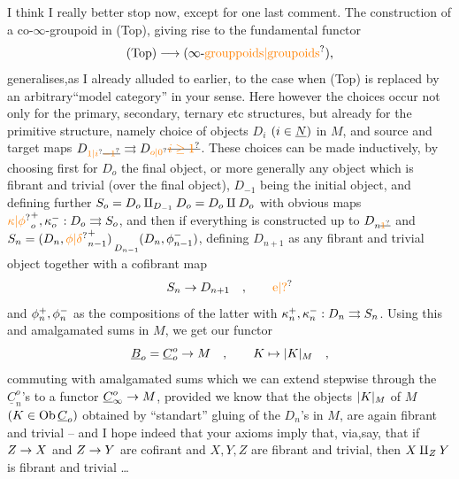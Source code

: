  I think I really better stop now, except for one last comment. The construction of a co-$\infty$-groupoid in (Top), giving rise to the fundamental functor
\[
(\mathrm{Top})\handwritten{\longrightarrow}(\infty\text{-}\unsure{\text{grouppoids}|\text{groupoids}}),
\]
generalises,as I already alluded to earlier, to the case when (Top) is replaced by an arbitrary``model category'' in your sense. Here however the choices occur not only  for the primary, secondary, ternary etc structures, but already for the primitive structure, namely  choice of objects $D_i$ $(i\in\underline{N})$ in $M$, and source and target maps $D_{\unsure{1|i}\deleted{\unsure{-1}}}\handwritten{\rightrightarrows}D_{\unsure{o|0}}\deleted{\unsure{i\geq1}}$. These choices can be made inductively, by choosing first for $D_o$ the final object, or more generally any object which is fibrant and trivial (over the final object), $D_{-1}$ being the initial object, and defining further $S_o=D_o\amalg_{D_{-1}}D_o=D_o\amalg D_o$ with obvious maps ${\handwritten{\unsure{\kappa|\phi}}}_o^{+},\handwritten{\kappa}_o^{-}:D_o\handwritten{\rightrightarrows}S_o$, and then if everything is constructed up to $D_{n\deleted{\unsure{1}}}$\deleted{\unsure{)}} and $S_n=(D_n,{\handwritten{\unsure{\phi|\delta}}}_{n-1}^{+})\mathop{\phantom{\amalg}}\limits_{D_{n-1}}(D_n,\handwritten{\phi}_{n-1}^{-})$, defining $D_{n+1}$ as any fibrant and trivial object together with a cofibrant map
\[
S_n\handwritten{\to}D_{n+1}\quad ,\qquad \unsure{\mathrm{e}|?}
\]
and $\phi_n^+,\phi_n^-$ as the compositions of the latter with $\kappa_n^+,\kappa_n^-:D_n\rightrightarrows S_n$. Using this and amalgamated sums in $M$, we get our functor
\[
\underline{B}_o = \underline{C}_o^{o}\to M\quad ,\qquad K\mapsto|K|_M\quad ,
\]
commuting with amalgamated sums which we can extend stepwise through the $\underline{C}_n^{o}$'s to a functor $\underline{C}_{\infty}^{o}\to M$, provided we know that the objects $|K|_M$ of $M$ $(K\in\operatorname{Ob}\underline{C}_o)$ obtained  by ``standart'' gluing of the $D_n$'s in $M$, are again fibrant and trivial -- and I hope indeed that your axioms imply that, via,say, that if $Z\to X$ and $Z\to Y$ are cofirant and $X,Y,Z$ are fibrant and trivial, then $X\amalg_ZY$ is fibrant and trivial \ldots

